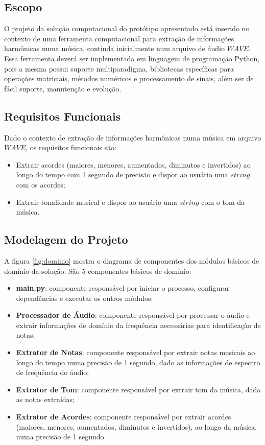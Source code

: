 \subsection{Escopo}
O projeto da solução computacional do protótipo apresentado está inserido no contexto de uma ferramenta computacional para extração de informações harmônicas numa música, continda inicialmente num arquivo de áudio $WAVE$. Essa ferramenta deverá ser implementada em linguagem de programação Python, pois a mesma possui suporte multiparadigma, bibliotecas específicas para operações matriciais, métodos numéricos e processamento de sinais, além ser de fácil suporte, manutenção e evolução.

\subsection{Requisitos Funcionais}
Dado o contexto de extração de informações harmônicas numa música em arquivo $WAVE$, os requisitos funcionais são:
\begin{itemize}
	\item Extrair acordes (maiores, menores, aumentados, diminutos e invertidos) ao longo do tempo com 1 segundo de precisão e dispor ao usuário uma $string$ com os acordes;
	\item Extrair tonalidade musical e dispor ao usuário uma $string$ com o tom da música.
\end{itemize}

\subsection{Modelagem do Projeto}

A figura \ref{fig:dominio} mostra o diagrama de componentes dos módulos básicos de domínio da solução. São 5 componentes básicos de domínio:
\begin{itemize}
	\item \textbf{main.py}: componente responsável por iniciar o processo, configurar dependências e executar os outros módulos;
	\item \textbf{Processador de Áudio}: componente responsável por processar o áudio e extrair informações de domínio da frequência necessárias para identificação de notas;
	\item \textbf{Extrator de Notas}: componente responsável por extrair notas musicais ao longo do tempo numa precisão de 1 segundo, dado as informações de espectro de frequência do áudio;
	\item \textbf{Extrator de Tom}: componente responsável por extrair tom da música, dada as notas extraídas;
	\item \textbf{Extrator de Acordes}: componente responsável por extrair acordes (maiores, menores, aumentados, diminutos e invertidos), ao longo da música, numa precisão de 1 segundo.
\end{itemize}

